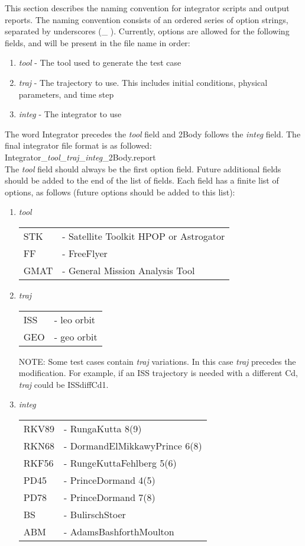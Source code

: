This section describes the naming convention for integrator scripts
and output reports. The naming convention consists of an ordered
series of option strings, separated by underscores (\_ ). Currently,
options are allowed for the following fields, and will be present in
the file name in order:
\begin{enumerate}
  \item \emph{tool} - The tool used to generate the test case
  \item \emph{traj} - The trajectory to use.  This includes initial conditions, physical parameters, and time step
  \item \emph{integ} - The integrator to use
\end{enumerate}

The word Integrator precedes the \emph{tool} field and 2Body follows
the \emph{integ} field. The final integrator file format is as followed:\\
Integrator\_\emph{tool}\_\emph{traj}\_\emph{integ}\_2Body.report\\

The \emph{tool} field should always be the first option field.
Future additional fields should be added to the end of the list of
fields. Each field has a finite list of options, as follows (future
options should be added to this list):
\begin{enumerate}
  \item \emph{tool}
  \begin{tabular}{ll}
    STK  & - Satellite Toolkit HPOP or Astrogator\\
    FF   & - FreeFlyer\\
    GMAT & - General Mission Analysis Tool\\
  \end{tabular}

  \item \emph{traj}
  \begin{tabular}{ll}
    ISS & - leo orbit\\
    GEO & - geo orbit\\
  \end{tabular}

NOTE:  Some test cases contain \emph{traj} variations. In this case
\emph{traj} precedes the modification. For example, if an ISS
trajectory is needed with a different Cd, \emph{traj} could be
ISSdiffCd1.

  \item \emph{integ}
  \begin{tabular}{ll}
    RKV89 & - RungaKutta 8(9)\\
    RKN68 & - DormandElMikkawyPrince 6(8)\\
    RKF56 & - RungeKuttaFehlberg 5(6)\\
    PD45  & - PrinceDormand 4(5)\\
    PD78  & - PrinceDormand 7(8)\\
    BS & - BulirschStoer\\
    ABM & - AdamsBashforthMoulton\\
  \end{tabular}
\end{enumerate}

